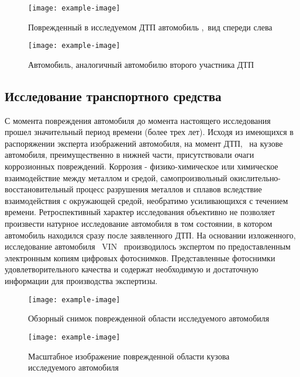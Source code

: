 \begin{figure}[h!]\centering
	\parbox[t]{0.49\textwidth}
	{\centering
		\texttt{[image: example-image]}
		\caption{\footnotesize {Поврежденный в исследуемом ДТП автомобиль ,\, вид спереди слева}}
		\label{ris:images/b3}}
	\hfil \hfil
	\parbox[t]{0.49\textwidth}
	{\centering
		\texttt{[image: example-image]}
		\caption{\footnotesize {Автомобиль, аналогичный автомобилю второго участника ДТП \tcb}}
		\label{ris:images/b4}}
\end{figure}



\subsection{Исследование транспортного средства}
%
С момента повреждения автомобиля до момента настоящего исследования прошел значительный период времени (более трех лет). Исходя из имеющихся в распоряжении эксперта изображений автомобиля, на момент ДТП, \, на кузове автомобиля, преимущественно в нижней части, присутствовали  очаги коррозионных повреждений. Коррозия - физико-химическое или химическое взаимодействие между металлом и средой,  самопроизвольный окислительно-восстановительный процесс разрушения металлов и сплавов вследствие взаимодействия с окружающей средой,   необратимо усиливающихся с течением времени.  Ретроспективный характер исследования объективно не позволяет произвести натурное исследование автомобиля в том состоянии, в котором  автомобиль находился сразу  после заявленного ДТП.  На основании изложенного, исследование автомобиля \, VIN \, производилось экспертом по предоставленным электронным копиям цифровых фотоснимков. Представленные фотоснимки удовлетворительного качества и содержат необходимую и достаточную информации для производства экспертизы.


\begin{figure}[!h]\centering
	\parbox[t]{0.49\textwidth}
	{\centering
		\texttt{[image: example-image]}
		\caption{\footnotesize {Обзорный снимок поврежденной области исследуемого автомобиля }}
		\label{ris:images/tc2}}
	\hfil \hfil
	\parbox[t]{0.49\textwidth}
	{\centering
		\texttt{[image: example-image]}
		\caption{\footnotesize {Масштабное изображение  поврежденной области кузова исследуемого автомобиля}}
		\label{ris:images/tc3}}
	
\end{figure}



